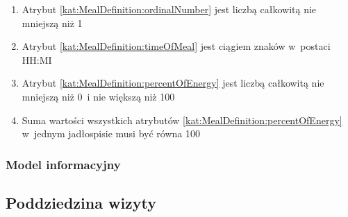 \begin{itemize}[label={\textbf{Ograniczenia dla}}, wide, labelwidth=!, labelindent=0pt]
\begin{enumerate}[label={\textbf{OGR/4/\protect\twodigits{\arabic{enumi}}}}, wide, labelwidth=!, align=left, leftmargin=3cm, resume]
        \item Atrybut \ref{kat:MealDefinition:ordinalNumber} jest liczbą całkowitą nie mniejszą niż 1
        \item Atrybut \ref{kat:MealDefinition:timeOfMeal} jest ciągiem znaków w~postaci HH:MI
        \item Atrybut \ref{kat:MealDefinition:percentOfEnergy} jest liczbą całkowitą nie mniejszą niż 0~i nie większą niż 100
        \item Suma wartości wszystkich atrybutów \ref{kat:MealDefinition:percentOfEnergy} w~jednym jadłospisie musi być równa 100
    \end{enumerate}
\end{itemize}

\subsubsection{Model informacyjny}\label{subsubsec:database:mealplans:domainModel}


\subsection{Poddziedzina wizyty}\label{subsec:database:appointments}

